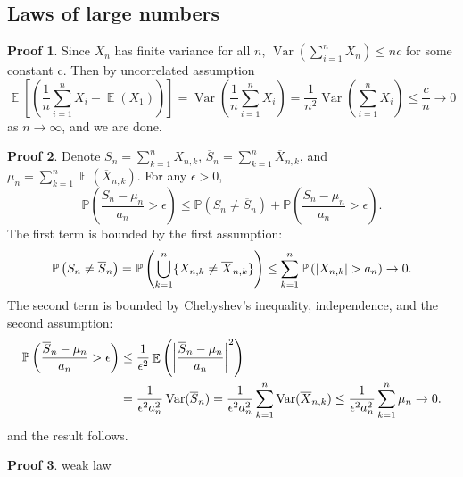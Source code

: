 \documentclass[hidelinks,11pt]{article}
\theoremstyle{definition}
\theoremstyle{dotless}
\newtheorem{prop}{Proof}[section]
\theoremstyle{remark}
\DeclareMathOperator{\Var}{Var}
\DeclareMathOperator{\E}{\mathbb{E}}
\DeclareMathOperator{\1}{\mathbf{1}}
\begin{document}
\subsection{Laws of large numbers}

\begin{prop}
Since $X_n$ has finite variance for all $n$, $\Var(\sum_{i=1}^nX_n)\leq nc$ for some constant c. Then by uncorrelated assumption
\[\E\left[\left(\frac{1}{n}\sum_{i=1}^nX_i-\E(X_1)\right)\right]=\Var\left(\frac{1}{n}\sum_{i=1}^nX_i\right)=\frac{1}{n^2}\Var\left(\sum_{i=1}^nX_i\right)\leq\frac{c}{n}\to0\]
as $n\to\infty$, and we are done.
\end{prop}

\begin{prop}
Denote $S_n=\sum_{k=1}^nX_{n,k}$, $\overline{S}_n=\sum_{k=1}^n\overline{X}_{n,k}$, and $\mu_n=\sum_{k=1}^n\E(\overline{X}_{n,k})$. For any $\epsilon>0$,
\[\mathbb{P}\left({\frac{S_n-\mu_n}{a_n}}>\epsilon\right)\leq\mathbb{P}(S_n\neq\overline{S}_n)+\mathbb{P}\left({\frac{\overline{S}_n-\mu_n}{a_n}}>\epsilon\right).\]
The first term is bounded by the first assumption:
\[\mathbb{P}\left(S_n\neq\overline{S}_n\right)=\mathbb{P}\left(\bigcup_{k=1}^n\{X_{n,k}\neq\overline{X}_{n,k}\}\right)\leq\sum_{k=1}^n\mathbb{P}\left(\abs{X_{n,k}}>a_n\right)\to0.\]
The second term is bounded by Chebyshev's inequality, independence, and the second assumption:
\begin{align*}
\mathbb{P}\left({\frac{\overline{S}_n-\mu_n}{a_n}}>\epsilon\right)&\leq\frac{1}{\epsilon^2}\E\left(\abs{\frac{\overline{S}_n-\mu_n}{a_n}}^2\right)\\
&=\frac{1}{\epsilon^2a_n^2}\Var(\overline{S}_n)=\frac{1}{\epsilon^2a_n^2}\sum_{k=1}^n\Var(\overline{X}_{n,k})\leq\frac{1}{\epsilon^2a_n^2}\sum_{k=1}^n\mu_n\to0.
\end{align*}
and the result follows.
\end{prop}

\begin{prop}
weak law
\end{prop}
\end{document}
